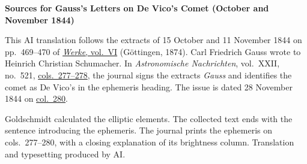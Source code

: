 \clearpage\thispagestyle{empty}
\begin{center}\textbf{Sources for Gauss’s Letters on De Vico’s Comet (October and November 1844)}\end{center}
\noindent This AI translation follows the extracts of 15 October and 11 November 1844 on pp.~469--470 of \href{https://gdz.sub.uni-goettingen.de/id/PPN236007467}{\textit{Werke}, vol.~VI} (Göttingen, 1874). Carl Friedrich Gauss wrote to Heinrich Christian Schumacher. In \textit{Astronomische Nachrichten}, vol.~XXII, no.~521, \href{https://api.digitale-sammlungen.de/iiif/image/v2/bsb10049447_00147/full/1800,/0/default.jpg}{cols.~277--278}, the journal signs the extracts \textit{Gauss} and identifies the comet as De Vico’s in the ephemeris heading. The issue is dated 28 November 1844 on \href{https://api.digitale-sammlungen.de/iiif/image/v2/bsb10049447_00148/full/1800,/0/default.jpg}{col.~280}.
\par\smallskip\noindent Goldschmidt calculated the elliptic elements. The collected text ends with the sentence introducing the ephemeris. The journal prints the ephemeris on cols.~277--280, with a closing explanation of its brightness column. Translation and typesetting produced by AI.
\clearpage
